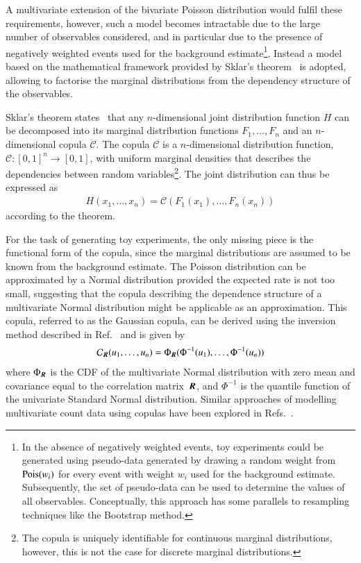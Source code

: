 A multivariate extension of the bivariate Poisson distribution would
fulfil these requirements, however, such a model becomes intractable
due to the large number of observables considered, and in particular
due to the presence of negatively weighted events used for the
background estimate\footnote{In the absence of negatively weighted
  events, toy experiments could be generated using pseudo-data
  generated by drawing a random weight from $\operatorname{Pois}(w_i)$ for every
  event with weight $w_i$ used for the background
  estimate. Subsequently, the set of pseudo-data can be used to
  determine the values of all observables. Conceptually, this approach
  has some parallels to resampling techniques like the Bootstrap
  method.}. Instead a model based on the mathematical framework
provided by Sklar's theorem~\cite{Sklar1959FonctionsDR} is adopted,
allowing to factorise the marginal distributions from the dependency
structure of the observables.

Sklar's theorem states~\cite{nelsen} that any $n$-dimensional joint
distribution function $H$ can be decomposed into its marginal
distribution functions $F_1, \dots, F_n$ and an $n$-dimensional copula
$\mathcal{C}$. The copula $\mathcal{C}$ is a $n$-dimensional
distribution function, $\mathcal{C}: [0, 1]^n \rightarrow [0, 1]$,
with uniform marginal densities that describes the dependencies
between random variables\footnote{The copula is uniquely identifiable
  for continuous marginal distributions, however, this is not the case
  for discrete marginal distributions.}. The joint distribution can
thus be expressed as
\begin{align*}
  H(x_1, \dots, x_n) = \mathcal{C}(F_1(x_1), \dots, F_n(x_n))
\end{align*}
according to the theorem.

For the task of generating toy experiments, the only missing piece is
the functional form of the copula, since the marginal distributions
are assumed to be known from the background estimate. The Poisson
distribution can be approximated by a Normal distribution provided the
expected rate is not too small, suggesting that the copula describing
the dependence structure of a multivariate Normal distribution might
be applicable as an approximation. This copula, referred to as the
Gaussian copula, can be derived using the inversion method described
in Ref.~\cite{nelsen} and is given by
\begin{align}
  \label{eq:gaussian_copula}
  \mathcal{C}_{\myvec{R}}(u_1, \dots, u_n) = \Phi_{\myvec{R}}(\Phi^{-1}(u_1), \dots, \Phi^{-1}(u_n))
\end{align}
where $\Phi_{\myvec{R}}$ is the CDF of the multivariate Normal
distribution with zero mean and covariance equal to the correlation
matrix~$\myvec{R}$, and $\Phi^{-1}$ is the quantile function of the
univariate Standard Normal distribution. Similar approaches of
modelling multivariate count data using copulas have been explored in
Refs.~\cite{10.1002/wics.1398}.

